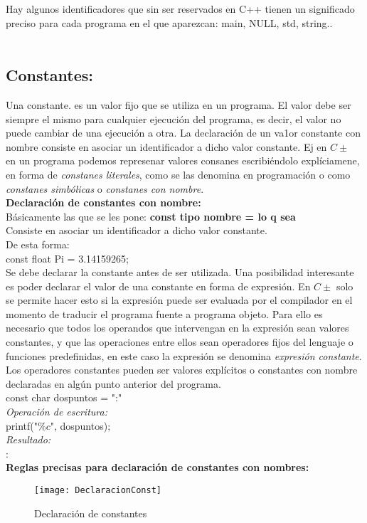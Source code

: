 \documentclass[11pt,a4paper]{article}
\begin{document}
 
 
 Hay algunos identificadores que sin ser reservados en C++ tienen un significado preciso para cada programa en el que aparezcan: main, NULL, std, string..\\
 \\
 \subsection{Constantes:}
 Una constante. es un valor fijo que se utiliza en un programa. El valor debe 
 ser siempre el mismo para cualquier ejecución del programa, es decir, el valor 
 no puede cambiar de una ejecución a otra. La declaración de un va1or constante con nombre consiste en asociar un identificador a dicho valor constante. Ej en $C\pm$\\
 en un programa podemos represenar valores consanes escribiéndolo explíciamene, en forma de \textit{constanes literales}, como se las denomina en programación o como \textit{constanes simbólicas} o \textit{constanes con nombre}. 
 \\
 \textbf{Declaración de constantes con nombre:}\\
 Básicamente las que se les pone: \textbf{const tipo nombre = lo q sea}\\
 Consiste en asociar un identificador a dicho valor constante.\\
 De esta forma:\\
 const float Pi = 3.14159265;\\
 Se debe declarar la constante antes de ser utilizada. Una posibilidad interesante es poder declarar el valor de una constante en 
 forma de expresión. En $C\pm$ solo se permite hacer esto si la expresión puede 
 ser evaluada por el compilador en el momento de traducir el programa fuente 
 a programa objeto. Para ello es necesario que todos los operandos que intervengan en la expresión sean valores constantes, y que las operaciones entre 
 ellos sean operadores fijos del lenguaje o funciones predefinidas, en este caso la expresión se denomina \textit{expresión constante}. Los operadores constantes pueden ser valores explícitos o constantes con nombre declaradas en algún punto anterior del programa.\\
 const char dospuntos = ":"\\
 \textit{Operación de escritura:}\\
 printf("$\% c$", dospuntos);\\
 \textit{Resultado:}\\
 :\\
 \textbf{Reglas precisas para declaración de constantes con nombres:}
 \begin{figure}[htb]
 	\centering
 	\texttt{[image: DeclaracionConst]}
 	\caption{Declaración de constantes}
 	\label{fig:Declaración constantes}
 \end{figure}
 
\end{document}
